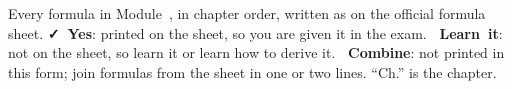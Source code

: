 \label{fg:chap}

\newcommand\fgYes{\textcolor{hscformula}{\footnotesize\bfseries\faCheck~Yes}}
\newcommand\fgNo{\textcolor{hscmistake}{\footnotesize\bfseries\faTimes~Learn~it}}
\newcommand\fgComb{\textcolor{hsctiptext}{\footnotesize\bfseries\faLink~Combine}}
\newcommand\fgf[1]{\raisebox{0pt}[\dimexpr\height+2.4pt\relax][\dimexpr\depth+2.4pt\relax]{#1}}
\newcommand\fgrow[4]{\fgf{#2} & #3 & #1 & #4\\\hline}
\newcommand\fgrowii[5]{\fgf{#2}\newline\fgf{#3} & #4 & #1 & #5\\\hline}
\newcommand\fgnext{\noalign{\vskip-0.4pt{\color{hscbrand!45}\hrule height 0.9pt}}}
\newcommand\fgch[1]{\hyperref[ch#1:chap]{\textbf{#1}}}
\newcommand\fghead{\colhead{Formula} & \colhead{What it is for} & \colhead{Sheet} &
  \colhead{Ch.}}

Every formula in Module~\modulenumber, in chapter order, written as on the official formula
sheet. \fgYes: printed on the sheet, so you are given it in the exam. \fgNo: not on the
sheet, so learn it or learn how to derive it. \fgComb: not printed in this form; join
formulas from the sheet in one or two lines. ``Ch.'' is the chapter.

